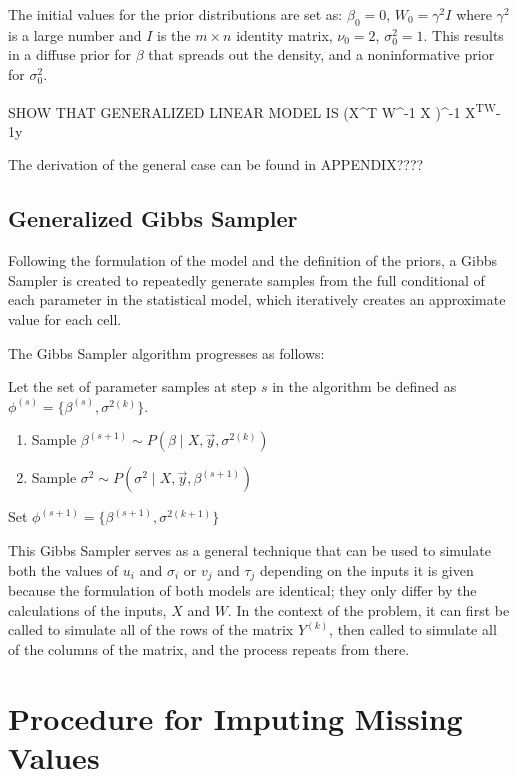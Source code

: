 \documentclass[12pt,twoside]{dukestatscithesis}
\theoremstyle{definition}
\theoremstyle{definition}
\theoremstyle{definition}
\theoremstyle{remark}
\begin{document}
The initial values for the prior distributions are set as:
\(\beta_0 = 0\), \(W_0 = \gamma^2I\) where \(\gamma^2\) is a large
number and \(I\) is the \(m \times n\) identity matrix, \(\nu_0 = 2\),
\(\sigma_0^2 = 1\). This results in a diffuse prior for \(\beta\) that
spreads out the density, and a noninformative prior for \(\sigma^2_0\).

SHOW THAT GENERALIZED LINEAR MODEL IS (X\^{}T W\^{}-1 X )\^{}-1
X\textsuperscript{TW}-1y

The derivation of the general case can be found in APPENDIX????

\subsection{Generalized Gibbs Sampler}\label{generalized-gibbs-sampler}

Following the formulation of the model and the definition of the priors,
a Gibbs Sampler is created to repeatedly generate samples from the full
conditional of each parameter in the statistical model, which
iteratively creates an approximate value for each cell.

The Gibbs Sampler algorithm progresses as follows:

Let the set of parameter samples at step \(s\) in the algorithm be
defined as \(\phi^{(s)} = \{\beta^{(s)}, \sigma^{2(k)}\}\).
\begin{enumerate}
\def\labelenumi{\arabic{enumi}.}
\item
  Sample \(\beta^{(s+1)} \sim P(\beta \mid X, \vec{y}, \sigma^{2(k)})\)
\item
  Sample \(\sigma^2 \sim P(\sigma^2 \mid X, \vec{y}, \beta^{(s+1)})\)
\end{enumerate}
Set \(\phi^{(s+1)} = \{\beta^{(s+1)}, \sigma^{2(k+1)}\}\)

This Gibbs Sampler serves as a general technique that can be used to
simulate both the values of \(u_i\) and \(\sigma_i\) or \(v_j\) and
\(\tau_j\) depending on the inputs it is given because the formulation
of both models are identical; they only differ by the calculations of
the inputs, \(X\) and \(W\). In the context of the problem, it can first
be called to simulate all of the rows of the matrix \(Y^{(k)}\), then
called to simulate all of the columns of the matrix, and the process
repeats from there.

\section{Procedure for Imputing Missing
Values}\label{procedure-for-imputing-missing-values}
\end{document}
